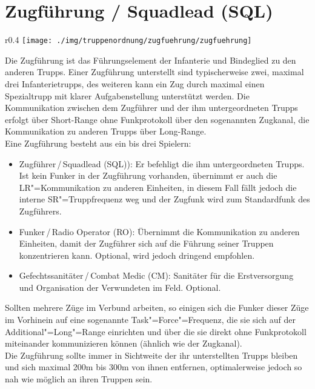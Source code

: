 \section{Zugführung / Squadlead (SQL)}
\begin{wrapfigure}{r}{0.4\textwidth}
	\centering 
	\vspace{-10pt}
	\texttt{[image: ./img/truppenordnung/zugfuehrung/zugfuehrung]}
	\vspace{-50pt}
\end{wrapfigure}
Die Zugführung ist das Führungselement der Infanterie und Bindeglied zu den anderen Trupps. Einer Zugführung unterstellt sind typischerweise zwei, maximal drei Infanterietrupps, des weiteren kann ein Zug durch maximal einen Spezialtrupp mit klarer Aufgabenstellung unterstützt werden. Die Kommunikation zwischen dem Zugführer und der ihm untergeordneten Trupps erfolgt über Short-Range ohne Funkprotokoll über den sogenannten Zugkanal, die Kommunikation zu anderen Trupps über Long-Range.\\

Eine Zugführung besteht aus ein bis drei Spielern:
\begin{itemize}
	\item Zugführer\,/\,Squadlead (SQL)): Er befehligt die ihm untergeordneten Trupps. Ist kein Funker in der Zugführung vorhanden, übernimmt er auch die LR"=Kommunikation zu anderen Einheiten, in diesem Fall fällt jedoch die interne SR"=Truppfrequenz weg und der Zugfunk wird zum Standardfunk des Zugführers.
	\item Funker\,/\,Radio Operator (RO): Übernimmt die Kommunikation zu anderen Einheiten, damit der Zugführer sich auf die Führung seiner Truppen konzentrieren kann. Optional, wird jedoch dringend empfohlen.
	\item Gefechtssanitäter\,/\,Combat Medic (CM): Sanitäter für die Erstversorgung und Organisation der Verwundeten im Feld. Optional.
\end{itemize}
Sollten mehrere Züge im Verbund arbeiten, so einigen sich die Funker dieser Züge im Vorhinein auf eine sogenannte Task"=Force"=Frequenz, die sie sich auf der Additional"=Long"=Range einrichten und über die sie direkt ohne Funkprotokoll miteinander kommunizieren können (ähnlich wie der Zugkanal).\\
Die Zugführung sollte immer in Sichtweite der ihr unterstellten Trupps bleiben und sich maximal 200m bis 300m von ihnen entfernen, optimalerweise jedoch so nah wie möglich an ihren Truppen sein.